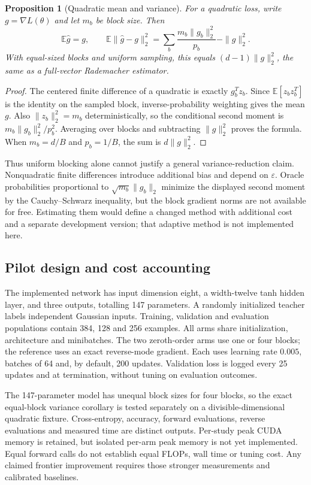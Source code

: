 \documentclass[10pt]{article}
\newtheorem{proposition}{Proposition}
\newcommand{\E}{\mathbb{E}}
\begin{document}
\begin{proposition}[Quadratic mean and variance]
For a quadratic loss, write $g=\nabla L(\theta)$ and let $m_b$ be block size. Then
\begin{equation}
 \E\widehat g=g,\qquad
 \E\|\widehat g-g\|_2^2=\sum_b\frac{m_b\|g_b\|_2^2}{p_b}-\|g\|_2^2.
\end{equation}
With equal-sized blocks and uniform sampling, this equals $(d-1)\|g\|_2^2$, the same as a full-vector Rademacher estimator.
\end{proposition}
\begin{proof}
The centered finite difference of a quadratic is exactly $g_b^Tz_b$. Since $\E[z_bz_b^T]$ is the identity on the sampled block, inverse-probability weighting gives the mean $g$. Also $\|z_b\|_2^2=m_b$ deterministically, so the conditional second moment is $m_b\|g_b\|_2^2/p_b^2$. Averaging over blocks and subtracting $\|g\|_2^2$ proves the formula. When $m_b=d/B$ and $p_b=1/B$, the sum is $d\|g\|_2^2$.
\end{proof}

Thus uniform blocking alone cannot justify a general variance-reduction claim. Nonquadratic finite differences introduce additional bias and depend on $\varepsilon$. Oracle probabilities proportional to $\sqrt{m_b}\|g_b\|_2$ minimize the displayed second moment by the Cauchy--Schwarz inequality, but the block gradient norms are not available for free. Estimating them would define a changed method with additional cost and a separate development version; that adaptive method is not implemented here.

\subsection{Pilot design and cost accounting}
The implemented network has input dimension eight, a width-twelve tanh hidden layer, and three outputs, totalling 147 parameters. A randomly initialized teacher labels independent Gaussian inputs. Training, validation and evaluation populations contain 384, 128 and 256 examples. All arms share initialization, architecture and minibatches. The two zeroth-order arms use one or four blocks; the reference uses an exact reverse-mode gradient. Each uses learning rate $0.005$, batches of 64 and, by default, 200 updates. Validation loss is logged every 25 updates and at termination, without tuning on evaluation outcomes.

The 147-parameter model has unequal block sizes for four blocks, so the exact equal-block variance corollary is tested separately on a divisible-dimensional quadratic fixture. Cross-entropy, accuracy, forward evaluations, reverse evaluations and measured time are distinct outputs. Per-study peak CUDA memory is retained, but isolated per-arm peak memory is not yet implemented. Equal forward calls do not establish equal FLOPs, wall time or tuning cost. Any claimed frontier improvement requires those stronger measurements and calibrated baselines.
\end{document}
